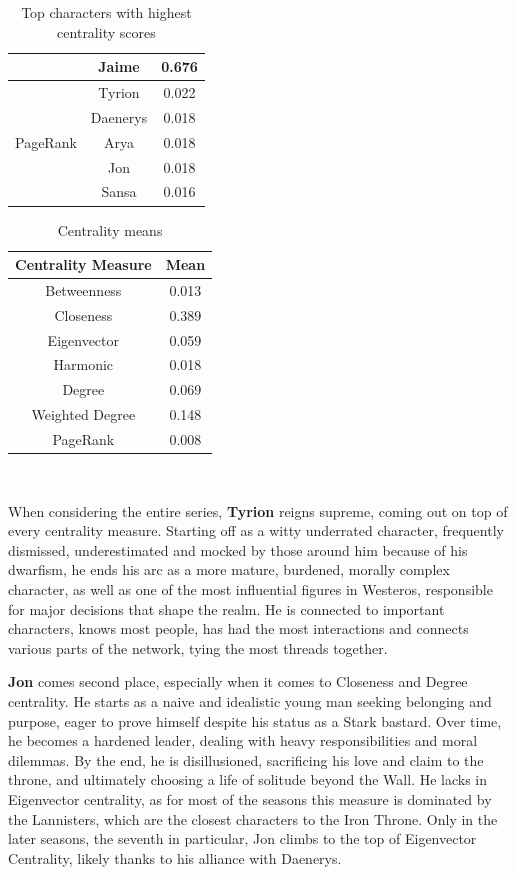 \documentclass[10pt,twocolumn,letterpaper]{article}
\begin{document}
\begin{table}[!h]
\begin{tabular}{c|c|c}
                    & Jaime & 0.676 \\
        \hline
                    & Tyrion & 0.022 \\
                    & Daenerys & 0.018 \\
        PageRank    & Arya & 0.018 \\
                    & Jon & 0.018 \\
                    & Sansa & 0.016 \\
        \hline
    \end{tabular}
    \vspace{0.2cm}
    \caption{Top characters with highest centrality scores}
    \label{tab:my_label}
\end{table}


\begin{table}[!h]
    \centering
    \small
    \begin{tabular}{c|c}
        Centrality Measure & Mean  \\
        \hline
        Betweenness & 0.013 \\
        Closeness & 0.389 \\
        Eigenvector & 0.059 \\
        Harmonic & 0.018 \\
        Degree & 0.069 \\
        Weighted Degree & 0.148 \\
        PageRank & 0.008 \\
        \hline 
    \end{tabular} \\
    \caption{Centrality means}
    \label{tab:my_label}
\end{table}


When considering the entire series, \textbf{Tyrion} reigns supreme, coming out on top of every centrality measure. Starting off as a witty underrated character, frequently dismissed, underestimated and mocked by those around him because of his dwarfism, he ends his arc as a more mature, burdened, morally complex character, as well as one of the most influential figures in Westeros, responsible for major decisions that shape the realm. He is connected to important characters, knows most people, has had the most interactions and connects various parts of the network, tying the most threads together.

\textbf{Jon} comes second place, especially when it comes to Closeness and Degree centrality. He starts as a naive and idealistic young man seeking belonging and purpose, eager to prove himself despite his status as a Stark bastard. Over time, he becomes a hardened leader, dealing with heavy responsibilities and moral dilemmas. By the end, he is disillusioned, sacrificing his love and claim to the throne, and ultimately choosing a life of solitude beyond the Wall. He lacks in Eigenvector centrality, as for most of the seasons this measure is dominated by the Lannisters, which are the closest characters to the Iron Throne. Only in the later seasons, the seventh in particular, Jon climbs to the top of Eigenvector Centrality, likely thanks to his alliance with Daenerys.
\end{document}
